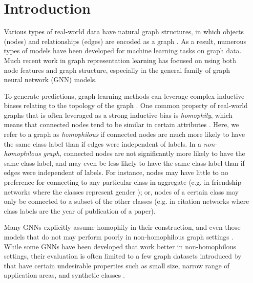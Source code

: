 \documentclass[sigconf, balance=false]{acmart}
\begin{document}
\section{Introduction}

Various types of real-world data have natural graph structures, in which objects (nodes) and relationships (edges) are encoded as a graph . As a result, numerous types of models have been developed for machine learning tasks on graph data. Much recent work in graph representation learning \cite{hamiltonbook} has focused on using both node features and graph structure, especially in the general family of graph neural network (GNN) models.

To generate predictions, graph learning methods can leverage complex inductive biases relating to the topology of the graph \cite{battaglia2018relational}. One common property of real-world graphs that is often leveraged as a strong inductive bias is \textit{homophily}, which means that connected nodes tend to be similar in certain attributes \cite{mcpherson2001birds, altenburger2018monophily}.
Here, we refer to a graph as \textit{homophilous} if connected nodes are much more likely to have the same class label than if edges were independent of labels.
In a \textit{non-homophilous graph}, connected nodes are not significantly more likely to have the same class label, and may even be less likely to have the same class label than if edges were independent of labels.
For instance, nodes may have little to no preference for connecting to any particular class in aggregate (e.g. in friendship networks where the classes represent gender \cite{laniado2016gender, altenburger2018monophily}); or, nodes of a certain class may only be connected to a subset of the other classes (e.g. in citation networks where class labels are the year of publication of a paper).

Many GNNs explicitly assume homophily in their construction, and even those models that do not may perform poorly in non-homophilous graph settings \cite{zhu2020beyond, jia2020residual}. While some GNNs have been developed that work better in non-homophilous settings, their evaluation is often limited to a few graph datasets introduced by \citet{pei2019geom} that have certain undesirable properties such as small size, narrow range of application areas, and synthetic classes \cite{zhu2020beyond, nonlocal, zhu2020graph, chien2021adaptive, chen2020simple, yan2021two}.
\end{document}
